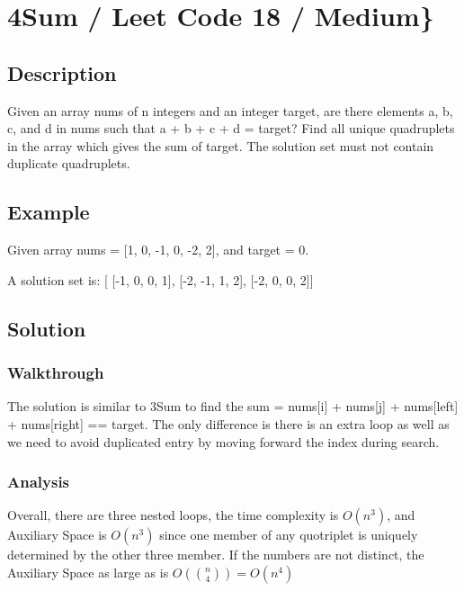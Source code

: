 \documentclass[]{book}
\begin{document}
\hypertarget{sum-leet-code-18-medium}{%
\section{4Sum / Leet Code 18 / Medium\}}\label{sum-leet-code-18-medium}}

\hypertarget{description-6}{%
\subsection{Description}\label{description-6}}

Given an array nums of n integers and an integer target, are there elements a, b, c, and d in nums such that
a + b + c + d = target? Find all unique quadruplets in the array which gives the sum of target. The solution set
must not contain duplicate quadruplets.

\hypertarget{example-5}{%
\subsection{Example}\label{example-5}}

Given array nums = {[}1, 0, -1, 0, -2, 2{]}, and target = 0.

A solution set is:
{[}
{[}-1, 0, 0, 1{]},
{[}-2, -1, 1, 2{]},
{[}-2, 0, 0, 2{]}{]}

\hypertarget{solution-5}{%
\subsection{Solution}\label{solution-5}}

\hypertarget{walkthrough-7}{%
\subsubsection{Walkthrough}\label{walkthrough-7}}

The solution is similar to 3Sum to find the sum = nums{[}i{]} + nums{[}j{]} + nums{[}left{]} + nums{[}right{]} == target. The only
difference is there is an extra loop as well as we need to avoid duplicated entry by moving forward the index
during search.

\hypertarget{analysis-7}{%
\subsubsection{Analysis}\label{analysis-7}}

Overall, there are three nested loops, the time complexity is \(O(n^3)\), and Auxiliary Space is \(O(n^3)\) since one member
of any quotriplet is uniquely determined by the other three member. If the numbers are not distinct, the Auxiliary
Space as large as is \(O(\binom{n}{4}) = O(n^4)\)
\end{document}
